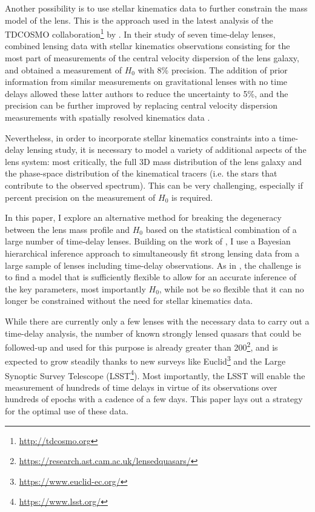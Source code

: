 \documentclass{aa}
\begin{document}
Another possibility is to use stellar kinematics data to further constrain the mass model of the lens. This is the approach used in the latest analysis of the TDCOSMO collaboration\footnote{\url{http://tdcosmo.org}} by \citet{Bir++20}. In their study of seven time-delay lenses, \citet{Bir++20} combined lensing data with stellar kinematics observations consisting for the most part of measurements of the central velocity dispersion of the lens galaxy, and obtained a measurement of $H_0$ with 8\% precision. The addition of prior information from similar measurements on gravitational lenses with no time delays allowed these latter authors to reduce the uncertainty to 5\%, and the precision can be further improved by replacing central velocity dispersion measurements with spatially resolved kinematics data \citep{YSH20,B+T21}.

Nevertheless, in order to incorporate stellar kinematics constraints into a time-delay lensing study, it is necessary to model a variety of additional aspects of the lens system: most critically, the full 3D mass distribution of the lens galaxy and the phase-space distribution of the kinematical tracers (i.e. the stars that contribute to the observed spectrum). This can be very challenging, especially if percent precision on the measurement of $H_0$ is required.

In this paper, I explore an alternative method for breaking the degeneracy between the lens mass profile and $H_0$ based on the statistical combination of a large number of time-delay lenses.
Building on the work of \citet[][, hereafter Paper I]{S+C21}, I use a Bayesian hierarchical inference approach to simultaneously fit strong lensing data from a large sample of lenses including time-delay observations.
As in , the challenge is to find a model that is sufficiently flexible to allow for an accurate inference of the key parameters, most importantly $H_0$, while not be so flexible that it can no longer be constrained without the need for stellar kinematics data.

While there are currently only a few lenses with the necessary data to carry out a time-delay analysis, the number of known strongly lensed quasars that could be followed-up and used for this purpose is already greater than 200\footnote{\url{https://research.ast.cam.ac.uk/lensedquasars/}}, and is expected to grow steadily thanks to new surveys like Euclid\footnote{\url{https://www.euclid-ec.org/}} and the Large Synoptic Survey Telescope (LSST\footnote{\url{https://www.lsst.org/}}). Most importantly, the LSST will enable the measurement of hundreds of time delays \citep{Lia++15} in virtue of its observations over hundreds of epochs with a cadence of a few days.
This paper lays out a strategy for the optimal use of these data.
\end{document}
